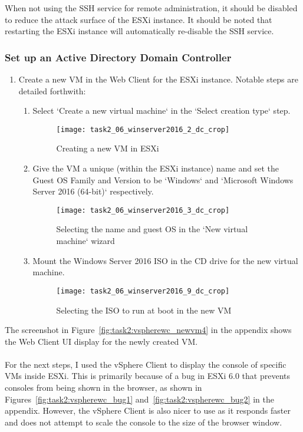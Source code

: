 \noindent When not using the SSH service for remote administration, it should be disabled to reduce the attack surface of the ESXi instance. It should be noted that restarting the ESXi instance will automatically re-disable the SSH service.

\subsubsection{Set up an Active Directory Domain Controller}
\begin{enumerate}[series=task2methodology2]
  \item Create a new VM in the Web Client for the ESXi instance. Notable steps are detailed forthwith:
    \begin{enumerate}[label=(\alph*)]
      \item Select `Create a new virtual machine` in the `Select creation type` step.
        \begin{figure}[H]
          \centering
          \captionsetup{skip=2pt}
          \texttt{[image: task2\_06\_winserver2016\_2\_dc\_crop]}
          \caption{Creating a new VM in ESXi}
          \label{fig:task2:vspherewc_newvm1}
        \end{figure}
      \item Give the VM a unique (within the ESXi instance) name and set the Guest OS Family and Version to be `Windows` and `Microsoft Windows Server 2016 (64-bit)` respectively.
        \begin{figure}[H]
          \centering
          \captionsetup{skip=2pt}
          \texttt{[image: task2\_06\_winserver2016\_3\_dc\_crop]}
          \caption{Selecting the name and guest OS in the `New virtual machine` wizard}
          \label{fig:task2:vspherewc_newvm2}
        \end{figure}
      \item Mount the Windows Server 2016 ISO in the CD drive for the new virtual machine.
      \begin{figure}[H]
        \centering
        \captionsetup{skip=2pt}
        \texttt{[image: task2\_06\_winserver2016\_9\_dc\_crop]}
        \caption{Selecting the ISO to run at boot in the new VM}
        \label{fig:task2:vspherewc_newvm3}
      \end{figure}
    \end{enumerate}
\end{enumerate}

\noindent The screenshot in Figure~\ref{fig:task2:vspherewc_newvm4} in the  appendix shows the Web Client UI display for the newly created VM.\\\\
\noindent For the next steps, I used the vSphere Client to display the console of specific VMs inside ESXi. This is primarily because of a bug in ESXi 6.0 that prevents consoles from being shown in the browser, as shown in Figures~\ref{fig:task2:vspherewc_bug1} and~\ref{fig:task2:vspherewc_bug2} in the  appendix. However, the vSphere Client is also nicer to use as it responds faster and does not attempt to scale the console to the size of the browser window.

